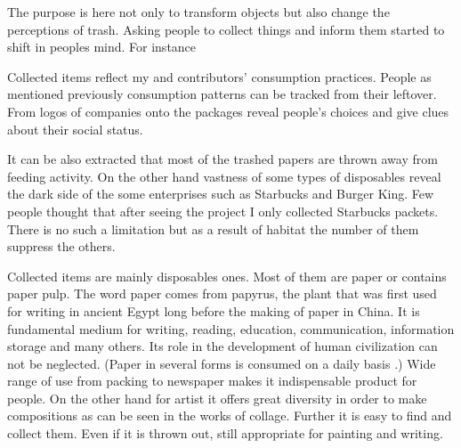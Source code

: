 

The purpose is here not only to transform objects but also change the perceptions of trash. Asking people to collect things and inform them started to shift in peoples mind. For instance 

Collected items reflect my and contributors' consumption practices. People as mentioned previously consumption patterns can be tracked from their leftover. From logos of companies onto the packages reveal people's choices and give clues about their social status.

It can be also extracted that most of the trashed papers are thrown away from feeding activity. On the other hand vastness of some types of disposables reveal the dark side of the some enterprises such as Starbucks and Burger King. Few people thought that after seeing the project I only collected Starbucks packets. There is no such a limitation but as a result of habitat the number of them suppress the others.

Collected items are mainly disposables ones. Most of them are paper or contains paper pulp. The word paper comes from papyrus, the plant that was first used for writing in ancient Egypt long before the making of paper in China. It is fundamental medium for writing, reading, education, communication, information storage and many others. Its role in the development of human civilization can not be neglected. (Paper in several forms is consumed on a daily basis \cite{trafford2012paper}.) Wide range of use from packing to newspaper makes it indispensable product for people. On the other hand for artist it offers great diversity in order to make compositions as can be seen in the works of collage. Further it is easy to find and collect them. Even if it is thrown out, still appropriate for painting and writing.


